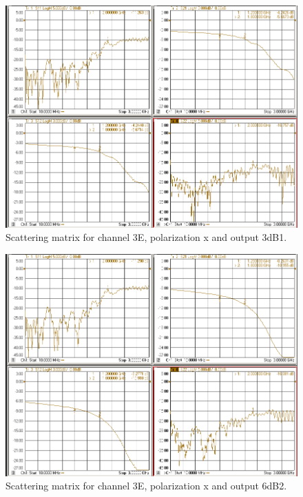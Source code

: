 \documentclass[12pt,a4paper,oneside]{article}
\begin{document}
\begin{figure}[H]
\centering
\includegraphics[width=0.9\linewidth]{VNA_results/3Ex_3dB1.png}
\caption{Scattering matrix for channel 3E, polarization x and output 3dB1.}
\label{fig:3Ex_3dB1}
\end{figure}


\begin{figure}[H]
\centering
\includegraphics[width=0.9\linewidth]{VNA_results/3Ex_6dB2.png}
\caption{Scattering matrix for channel 3E, polarization x and output 6dB2.}
\label{fig:3Ex_6dB2}
\end{figure}
\end{document}
